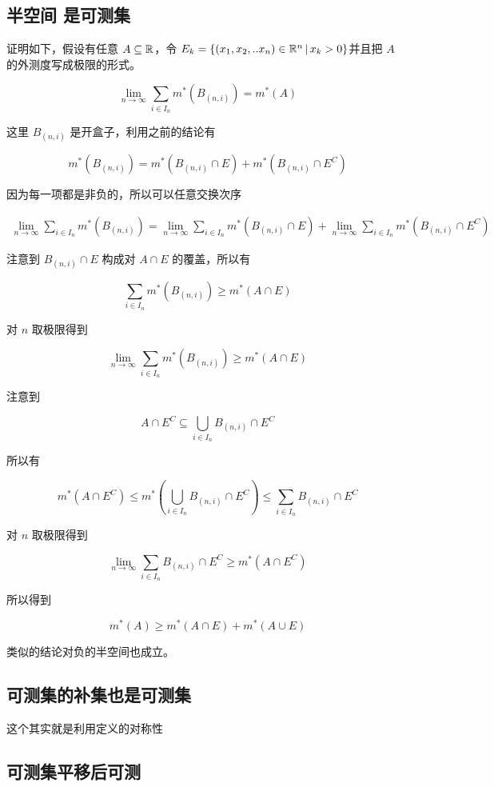 \subsection{半空间 是可测集} 

证明如下，假设有任意 $A \subseteq \mathbb{R}$，令 $ E_k = \{ (x_1, x_2, .. x_n) \in \mathbb{R}^n \,\vert\, x_k > 0\}$并且把 $A$ 的外测度写成极限的形式。

\[
\lim_{n \to \infty} \sum_{i \in I_n}m^*(B_{(n,i)}) = m^*(A)
\]

这里 $B_{(n,i)}$ 是开盒子，利用之前的结论有

\[
m^*(B_{(n,i)}) = m^*(B_{(n,i)} \cap E) + m^*(B_{(n,i)} \cap E^C)
\]


因为每一项都是非负的，所以可以任意交换次序

\begin{align*}
\lim_{n \to \infty} \sum_{i \in I_n}m^*(B_{(n,i)}) = \lim_{n \to \infty}\sum_{i \in I_n}m^*(B_{(n,i)} \cap E) + \lim_{n \to \infty}\sum_{i \in I_n}m^*(B_{(n,i)} \cap E^C)
\end{align*}

注意到 $B_{(n,i)} \cap E$ 构成对 $A \cap E$ 的覆盖，所以有

\[
\sum_{i \in I_n}m^*(B_{(n,i)}) \ge m^*(A \cap E)
\]

对 $n$ 取极限得到

\[
\lim_{n \to \infty} \sum_{i \in I_n}m^*(B_{(n,i)}) \ge m^*(A \cap E)
\]

注意到

\[
A \cap E^C \subseteq \bigcup_{i \in I_n} B_{(n,i)} \cap E^C
\]

所以有

\[
m^*(A \cap E^C) \le m^*(\bigcup_{i \in I_n} B_{(n,i)} \cap E^C) \le \sum_{i \in I_n} B_{(n,i)} \cap E^C
\]


对 $n$ 取极限得到

\[
\lim_{n \to \infty}\sum_{i \in I_n} B_{(n,i)} \cap E^C \ge m^*(A \cap E^C)
\]


所以得到 

\[
m^*(A) \ge m^*(A\cap E) + m^*(A \cup E) 
\]

类似的结论对负的半空间也成立。

\subsection{可测集的补集也是可测集}

这个其实就是利用定义的对称性

\subsection{可测集平移后可测}

